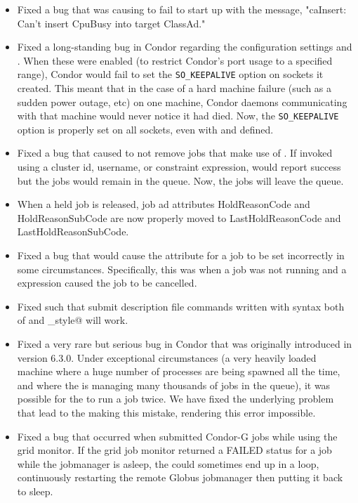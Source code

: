 \begin{itemize}
\item Fixed a bug that was causing  to fail to start up
with the message, "caInsert: Can't insert CpuBusy into target ClassAd."

\item Fixed a long-standing bug in Condor regarding the configuration
  settings  and .
  When these were enabled (to restrict Condor's port usage to a
  specified range), Condor would fail to set the
  \texttt{SO\_KEEPALIVE} option on sockets it created.
  This meant that in the case of a hard machine failure (such as a
  sudden power outage, etc) on one machine, Condor daemons
  communicating with that machine would never notice it had died.
  Now, the \texttt{SO\_KEEPALIVE} option is properly set on all
  sockets, even with  and 
  defined. 

\item Fixed a bug that caused   to not remove
  jobs that make use of .
  If invoked using a cluster id, username, or constraint expression,
   would report success but the jobs would remain in the queue.
  Now, the jobs will leave the queue.

\item When a held job is released, job ad attributes HoldReasonCode and
  HoldReasonSubCode are now properly moved to LastHoldReasonCode and
  LastHoldReasonSubCode.

\item Fixed a bug that would cause the  attribute
  for a job 
  to be set incorrectly in some circumstances.
  Specifically, this was when a job
  was not running and a  expression
  caused the job to be cancelled.

\item Fixed  such that submit description file
  commands written with syntax both of
  \verb@ThisStyle@ and \verb@this_style@ will work.

\item Fixed a very rare but serious bug in Condor that was originally
  introduced in version 6.3.0.
  Under exceptional circumstances (a very heavily loaded machine where
  a huge number of processes are being spawned all the time, and where
  the  is managing many thousands of jobs in the
  queue), it was possible for the  to run a job twice.
  We have fixed the underlying problem that lead to the
   making this mistake, rendering this error
  impossible.

\item Fixed a bug that occurred when submitted Condor-G jobs while
  using the grid monitor. If the grid job monitor returned a FAILED
  status for a job while the jobmanager is asleep, the 
  could sometimes end up in a loop, continuously restarting the remote
  Globus jobmanager then putting it back to sleep.

\end{itemize}

